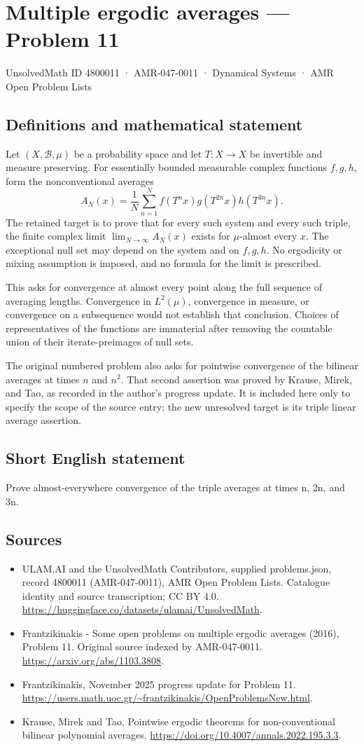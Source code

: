 \documentclass[11pt,a4paper]{article}
\begin{document}
\section*{Multiple ergodic averages — Problem 11}\label{4800011}
{\small UnsolvedMath ID 4800011 · AMR-047-0011 · Dynamical Systems · AMR Open Problem Lists}
\subsection{Definitions and mathematical statement}
Let $(X,\mathcal B,\mu)$ be a probability space and let
$T:X\to X$ be invertible and measure preserving. For
essentially bounded measurable complex functions $f,g,h$,
form the nonconventional averages
\[
 A_N(x)=\frac1N\sum_{n=1}^N
          f(T^n x)g(T^{2n}x)h(T^{3n}x).
\]
The retained target is to prove that for every such
system and every such triple, the finite complex limit
$\lim_{N\to\infty}A_N(x)$ exists for $\mu$-almost every
$x$. The exceptional null set may depend on the system
and on $f,g,h$. No ergodicity or mixing assumption is
imposed, and no formula for the limit is prescribed.

This asks for convergence at almost every point along
the full sequence of averaging lengths. Convergence in
$L^2(\mu)$, convergence in measure, or convergence on a
subsequence would not establish that conclusion. Choices
of representatives of the functions are immaterial after
removing the countable union of their iterate-preimages
of null sets.

The original numbered problem also asks for pointwise
convergence of the bilinear averages at times $n$ and $n^2$.
That second assertion was proved by Krause, Mirek, and
Tao, as recorded in the author's progress update. It is
included here only to specify the scope of the source
entry; the new unresolved target is its triple linear
average assertion.
\subsection{Short English statement}
Prove almost-everywhere convergence of the triple averages at times n, 2n, and 3n.
\subsection{Sources}
\begin{itemize}
\item[S1] ULAM.AI and the UnsolvedMath Contributors, supplied problems.json, record 4800011 (AMR-047-0011), AMR Open Problem Lists. Catalogue identity and source transcription; CC BY 4.0.
\url{https://huggingface.co/datasets/ulamai/UnsolvedMath}.
\item[S2] Frantzikinakis - Some open problems on multiple ergodic averages (2016), Problem 11. Original source indexed by AMR-047-0011.
\url{https://arxiv.org/abs/1103.3808}.
\item[S3] Frantzikinakis, November 2025 progress update for Problem 11.
\url{https://users.math.uoc.gr/~frantzikinakis/OpenProblemsNew.html}.
\item[S4] Krause, Mirek and Tao, Pointwise ergodic theorems for non-conventional bilinear polynomial averages.
\url{https://doi.org/10.4007/annals.2022.195.3.3}.
\end{itemize}
\end{document}
